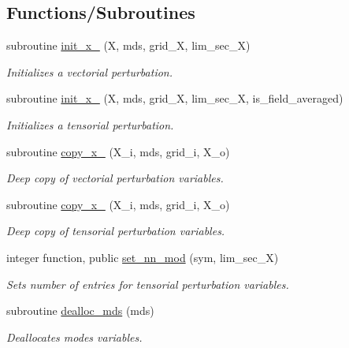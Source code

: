 \subsection*{Functions/\+Subroutines}
\begin{DoxyCompactItemize}
\item 
subroutine \hyperlink{namespacex__vars_a327c74a0fa8c50aa2ed812062bd82436}{init\+\_\+x\+\_} (X, mds, grid\+\_\+X, lim\+\_\+sec\+\_\+X)
\begin{DoxyCompactList}\small\item\em Initializes a vectorial perturbation. \end{DoxyCompactList}\item 
subroutine \hyperlink{namespacex__vars_a5cb61bfd7fbdae7bae2ec10b63160d74}{init\+\_\+x\+\_} (X, mds, grid\+\_\+X, lim\+\_\+sec\+\_\+X, is\+\_\+field\+\_\+averaged)
\begin{DoxyCompactList}\small\item\em Initializes a tensorial perturbation. \end{DoxyCompactList}\item 
subroutine \hyperlink{namespacex__vars_ae9744cbf1a4fc06080517a03ac43b960}{copy\+\_\+x\+\_} (X\+\_\+i, mds, grid\+\_\+i, X\+\_\+o)
\begin{DoxyCompactList}\small\item\em Deep copy of vectorial perturbation variables. \end{DoxyCompactList}\item 
subroutine \hyperlink{namespacex__vars_aeaa25b69e4ef9cc5882c9dcf894201d7}{copy\+\_\+x\+\_} (X\+\_\+i, mds, grid\+\_\+i, X\+\_\+o)
\begin{DoxyCompactList}\small\item\em Deep copy of tensorial perturbation variables. \end{DoxyCompactList}\item 
integer function, public \hyperlink{namespacex__vars_a90d744aee4358a8cc35d29304d1bb120}{set\+\_\+nn\+\_\+mod} (sym, lim\+\_\+sec\+\_\+X)
\begin{DoxyCompactList}\small\item\em Sets number of entries for tensorial perturbation variables. \end{DoxyCompactList}\item 
subroutine \hyperlink{namespacex__vars_a4a7e4b95bbcb90e8afb4985fc9456e67}{dealloc\+\_\+mds} (mds)
\begin{DoxyCompactList}\small\item\em Deallocates modes variables. \end{DoxyCompactList}\item 

\end{DoxyCompactItemize}
